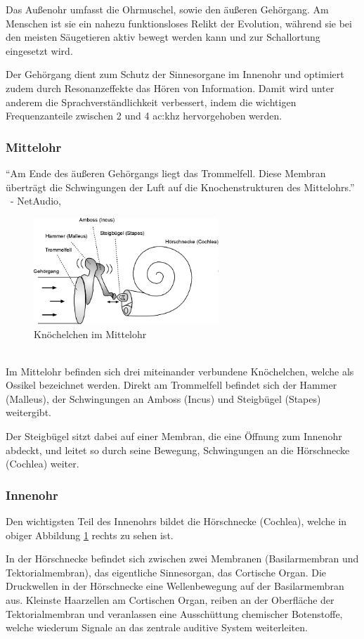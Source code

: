 Das Außenohr umfasst die Ohrmuschel, sowie den äußeren Gehörgang. Am Menschen ist sie ein nahezu funktionsloses Relikt der Evolution, während sie bei den meisten Säugetieren aktiv bewegt werden kann und zur Schallortung eingesetzt wird.

Der Gehörgang dient zum Schutz der Sinnesorgane im Innenohr und optimiert zudem durch Resonanzeffekte das Hören von Information. Damit wird unter anderem die Sprachverständlichkeit verbessert, indem die wichtigen Frequenzanteile zwischen 2 und 4 \gls{ac:khz} hervorgehoben werden.

\newpage
\subsubsection{Mittelohr}
\enquote{Am Ende des äußeren Gehörgangs liegt das Trommelfell. Diese Membran überträgt die Schwingungen der Luft auf die Knochenstrukturen des Mittelohrs.}
~\-- NetAudio,~\citeyear{netaudio:mittelohr}~\cite{netaudio:mittelohr}

\begin{figure}
	\centering
	\includegraphics[height=4cm]{images/ossikel.png}
	\caption{Knöchelchen im Mittelohr \cite{netaudio:mittelohr}}
	\label{fig:ossikel}
\end{figure}

~\\
Im Mittelohr befinden sich drei miteinander verbundene Knöchelchen, welche als Ossikel bezeichnet werden. Direkt am Trommelfell befindet sich der Hammer (Malleus), der Schwingungen an Amboss (Incus) und Steigbügel (Stapes) weitergibt.

Der Steigbügel sitzt dabei auf einer Membran, die eine Öffnung zum Innenohr abdeckt, und leitet so durch seine Bewegung, Schwingungen an die Hörschnecke (Cochlea) weiter.

\subsubsection{Innenohr}
Den wichtigsten Teil des Innenohrs bildet die Hörschnecke (Cochlea), welche in obiger Abbildung \ref{fig:ossikel} rechts zu sehen ist.

In der Hörschnecke befindet sich zwischen zwei Membranen (Basilarmembran und Tektorialmembran), das eigentliche Sinnesorgan, das Cortische Organ. Die Druckwellen in der Hörschnecke eine Wellenbewegung auf der Basilarmembran aus. Kleinste Haarzellen am Cortischen Organ, reiben an der Oberfläche der Tektorialmembran und veranlassen eine Ausschüttung chemischer Botenstoffe, welche wiederum Signale an das zentrale auditive System weiterleiten.


